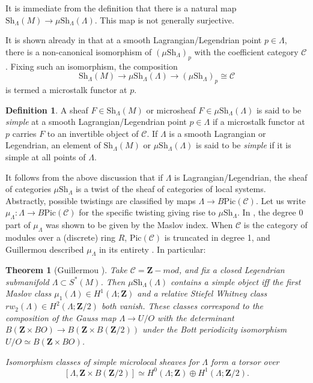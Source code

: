 \documentclass[12pt,a4paper]{article}
\numberwithin{equation}{section}
\newtheorem{thm}[equation]{Theorem}
\theoremstyle{definition}
\newtheorem{dfn}[equation]{Definition}
\theoremstyle{remark}
\newcommand{\Z}{\mathbf{Z}}
\newcommand{\Sh}{\mathrm{Sh}}
\newcommand{\Pic}{\mathrm{Pic}}
\begin{document}
It is immediate from the definition that there is a natural map
$\Sh_\Lambda(M) \to \mu \Sh_\Lambda(\Lambda)$.  This map is not generally surjective.

It is shown already in \cite{Kashiwara-Schapira} that at a smooth Lagrangian/Legendrian point $p \in \Lambda$, there is a non-canonical isomorphism of $(\mu \Sh_\Lambda)_p$ with the coefficient category $\mathcal{C}$.  Fixing such an isomorphism, the composition
$$\Sh_\Lambda(M) \to \mu \Sh_\Lambda(\Lambda) \to (\mu \Sh_\Lambda)_p \cong \mathcal{C}$$
is termed a microstalk functor at $p$.

\begin{dfn}
    A sheaf $F \in \Sh_\Lambda(M)$ or microsheaf $F \in \mu \Sh_\Lambda(\Lambda)$ is said to be {\em simple} at a smooth Lagrangian/Legendrian point $p \in \Lambda$ if a microstalk functor at $p$ carries $F$ to an invertible object of $\mathcal{C}$.  If $\Lambda$ is a smooth Lagrangian or Legendrian, an element of $\Sh_\Lambda(M)$ or $\mu \Sh_\Lambda(\Lambda)$ is said to be {\em simple} if it is simple at all points of $\Lambda$.
\end{dfn}

It follows from the above discussion that if $\Lambda$ is Lagrangian/Legendrian, the sheaf of categories  $\mu \Sh_\Lambda$ is a twist of the sheaf of categories of local systems.  Abstractly, possible twistings are classified by maps $\Lambda \to B\Pic(\mathcal{C})$. Let us write $\mu_\Lambda: \Lambda \to B\Pic(\mathcal{C})$ for the specific twisting giving rise to $\mu \Sh_\Lambda$.  In \cite{Kashiwara-Schapira}, the degree $0$ part of $\mu_\Lambda$ was shown to be given by the Maslov index.  When $\mathcal{C}$ is the category of modules over a (discrete) ring $R$, $\Pic(\mathcal{C})$ is truncated in degree 1, and Guillermou described $\mu_\Lambda$ in its entirety \cite{Guillermou}. In particular:

\begin{thm}[Guillermou \cite{Guillermou}]
Take $\mathcal{C} = \Z-mod$, and fix a closed Legendrian submanifold $\Lambda \subset S^*(M)$.
Then $\mu \Sh_\Lambda(\Lambda)$ contains a simple object iff the first Maslov class $\mu_1(\Lambda) \in H^1(\Lambda;\Z)$ and a relative Stiefel Whitney class
$rw_2(\Lambda) \in H^2(\Lambda;\Z/2)$ both vanish. These classes correspond to the composition
of the Gauss map $\Lambda\to U/O$ with the determinant $B(\Z\times BO) \to B(\Z\times B(\Z/2))$ under
the Bott periodicity isomorphism $U/O \simeq B(\Z\times BO)$.

Isomorphism classes of simple microlocal sheaves for $\Lambda$ form a torsor over
\[[\Lambda, \Z\times B(\Z/2)]\simeq H^0(\Lambda;\Z)\oplus H^1(\Lambda;\Z/2).\]
\end{thm}
\end{document}
